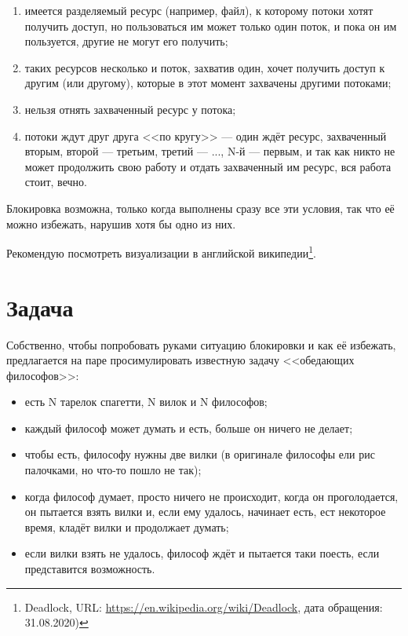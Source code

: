 \documentclass{../../text-style}
\begin{document}
\begin{enumerate}
    \item имеется разделяемый ресурс (например, файл), к которому потоки хотят получить доступ, но пользоваться им может только один поток, и пока он им пользуется, другие не могут его получить;
    \item таких ресурсов несколько и поток, захватив один, хочет получить доступ к другим (или другому), которые в этот момент захвачены другими потоками;
    \item нельзя отнять захваченный ресурс у потока;
    \item потоки ждут друг друга <<по кругу>> --- один ждёт ресурс, захваченный вторым, второй --- третьим, третий --- ..., N-й --- первым, и так как никто не может продолжить свою работу и отдать захваченный им ресурс, вся работа стоит, вечно.
\end{enumerate}

Блокировка возможна, только когда выполнены сразу все эти условия, так что её можно избежать, нарушив хотя бы одно из них.

Рекомендую посмотреть визуализации в английской википедии\footnote{Deadlock, URL: \url{https://en.wikipedia.org/wiki/Deadlock}, дата обращения: 31.08.2020)}.

\section{Задача}

Собственно, чтобы попробовать руками ситуацию блокировки и как её избежать, предлагается на паре просимулировать известную задачу <<обедающих философов>>:

\begin{itemize}
    \item есть N тарелок спагетти, N вилок и N философов;
    \item каждый философ может думать и есть, больше он ничего не делает;
    \item чтобы есть, философу нужны две вилки (в оригинале философы ели рис палочками, но что-то пошло не так);
    \item когда философ думает, просто ничего не происходит, когда он проголодается, он пытается взять вилки и, если ему удалось, начинает есть, ест некоторое время, кладёт вилки и продолжает думать;
    \item если вилки взять не удалось, философ ждёт и пытается таки поесть, если представится возможность.
\end{itemize}
\end{document}
